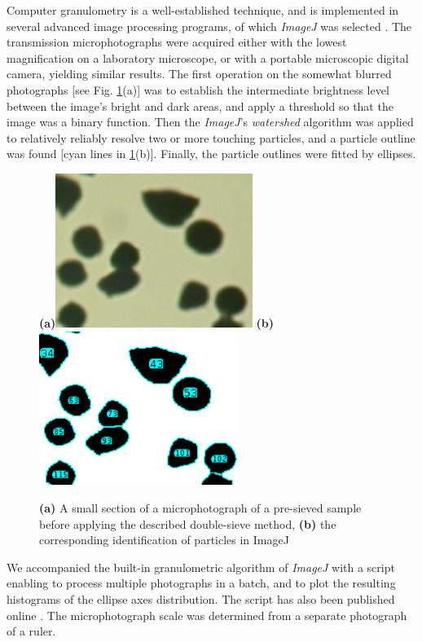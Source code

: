 Computer granulometry
is a well-established technique, and is implemented in several advanced image processing programs, of which \textit{ImageJ} was selected \cite{abramoff2004image}. 
The transmission microphotographs were acquired either with the lowest magnification on a laboratory microscope, or with a portable microscopic digital camera, yielding similar results.
The first operation on the somewhat blurred photographs [see Fig. \ref{fg_sievingstats}(a)] was to establish the intermediate brightness level between the image's bright and dark areas, and apply a threshold so that the image was a binary function. Then the \textit{ImageJ}'s \textit{watershed} algorithm was applied to relatively reliably resolve two or more touching particles, and a particle outline was found [cyan lines in \ref{fg_sievingstats}(b)]. Finally, the particle outlines were fitted by ellipses. 
\begin{figure}[ht] \caption{\textbf{(a)} A small section of a microphotograph of a pre-sieved sample before applying the described double-sieve method, \textbf{(b)} the corresponding identification of particles in ImageJ} \label{fg_sievingstats} \centering 
\textbf{(a)}\includegraphics[height=5cm]{img/technology/imagej_photo.pdf}
\textbf{(b)}\includegraphics[height=5cm]{img/technology/imagej_found.pdf}
\end{figure}
We accompanied the built-in granulometric algorithm of \textit{ImageJ} with a script enabling to process multiple photographs in a batch, and to plot the resulting histograms of the ellipse axes distribution. The script has also been published online \cite{dominec2014_imagej}. The microphotograph scale was determined from a separate photograph of a ruler.

